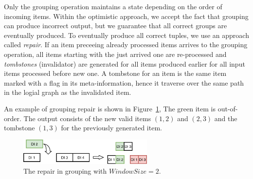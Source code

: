 Only the grouping operation maintains a state depending on the order of incoming items. 
%
Within the  optimistic approach, we accept the fact that grouping can produce incorrect output, but we guarantee that all correct groups are eventually produced. 
To eventually produce all correct tuples, we use an approach called {\it repair}. 
If an item preceeing already processed items arrives to the grouping operation, all items starting with the just arrived one are re-processed and {\em tombstones} (invalidator) are generated for all items produced earlier for all input items processed before new one. 
A tombstone for an item is the same item marked with a flag in its meta-information, hence it traverse over the same path in the logial graph as the invalidated item.



An example of grouping repair is shown in Figure~\ref{grouping-replaying}, 
The green item is out-of-order. 
The output consists of the new valid items  $(1, 2)$ and $(2, 3)$  and the tombstone $(1, 3)$ for the previously generated item.

\begin{figure}[ht]
  \centering
  \includegraphics[width=0.6\textwidth]{pics/grouping-replaying}
  \caption{The repair in grouping with $WindowSize = 2$. %
  }
  \label {grouping-replaying}
\end{figure}

